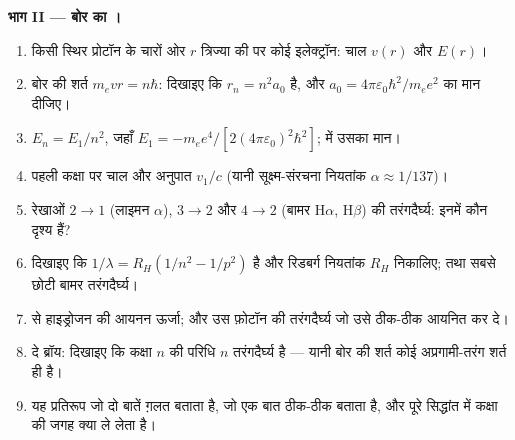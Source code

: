 \begin{problem}
\medskip
\noindent\textbf{भाग II --- बोर का ।}
\begin{enumerate}[resume]
  \item किसी स्थिर प्रोटॉन के चारों ओर $r$ त्रिज्या की  पर
        कोई इलेक्ट्रॉन: चाल $v(r)$ और  $E(r)$।
  \item बोर की शर्त $m_evr = n\hbar$: दिखाइए कि $r_n = n^2a_0$ है, और
        $a_0 = 4\pi\varepsilon_0\hbar^2/m_ee^2$ का मान दीजिए।
  \item $E_n = E_1/n^2$, जहाँ $E_1 = -m_ee^4/[2(4\pi\varepsilon_0)^2\hbar^2]$;
         में उसका मान।
  \item पहली कक्षा पर चाल और अनुपात $v_1/c$ (यानी सूक्ष्म-संरचना नियतांक
        $\alpha \approx 1/137$)।
  \item रेखाओं $2 \to 1$ (लाइमन $\alpha$), $3 \to 2$ और
        $4 \to 2$ (बामर H$\alpha$, H$\beta$) की तरंगदैर्घ्य: इनमें कौन दृश्य हैं?
  \item दिखाइए कि $1/\lambda = R_H(1/n^2 - 1/p^2)$ है और रिडबर्ग नियतांक
        $R_H$ निकालिए; तथा सबसे छोटी बामर तरंगदैर्घ्य।
  \item {} से हाइड्रोजन की आयनन ऊर्जा; और उस फ़ोटॉन की तरंगदैर्घ्य
        जो उसे ठीक-ठीक आयनित कर दे।
  \item दे ब्रॉय: दिखाइए कि कक्षा $n$ की परिधि $n$ तरंगदैर्घ्य है --- यानी
        बोर की शर्त कोई अप्रगामी-तरंग शर्त ही है।
  \item यह प्रतिरूप जो दो बातें ग़लत बताता है, जो एक बात ठीक-ठीक बताता है,
        और पूरे सिद्धांत में कक्षा की जगह क्या ले लेता है।
\end{enumerate}


\end{problem}
